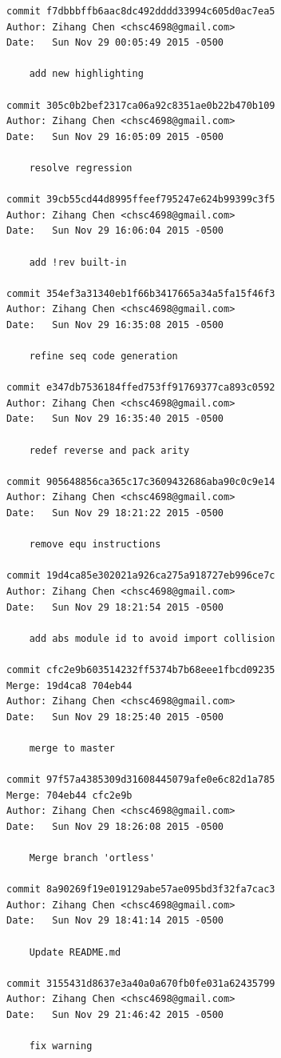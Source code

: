 \documentclass{report}
\begin{document}
\begin{appendices}
\begin{verbatim}
commit f7dbbbffb6aac8dc492dddd33994c605d0ac7ea5
Author: Zihang Chen <chsc4698@gmail.com>
Date:   Sun Nov 29 00:05:49 2015 -0500

    add new highlighting

commit 305c0b2bef2317ca06a92c8351ae0b22b470b109
Author: Zihang Chen <chsc4698@gmail.com>
Date:   Sun Nov 29 16:05:09 2015 -0500

    resolve regression

commit 39cb55cd44d8995ffeef795247e624b99399c3f5
Author: Zihang Chen <chsc4698@gmail.com>
Date:   Sun Nov 29 16:06:04 2015 -0500

    add !rev built-in

commit 354ef3a31340eb1f66b3417665a34a5fa15f46f3
Author: Zihang Chen <chsc4698@gmail.com>
Date:   Sun Nov 29 16:35:08 2015 -0500

    refine seq code generation

commit e347db7536184ffed753ff91769377ca893c0592
Author: Zihang Chen <chsc4698@gmail.com>
Date:   Sun Nov 29 16:35:40 2015 -0500

    redef reverse and pack arity

commit 905648856ca365c17c3609432686aba90c0c9e14
Author: Zihang Chen <chsc4698@gmail.com>
Date:   Sun Nov 29 18:21:22 2015 -0500

    remove equ instructions

commit 19d4ca85e302021a926ca275a918727eb996ce7c
Author: Zihang Chen <chsc4698@gmail.com>
Date:   Sun Nov 29 18:21:54 2015 -0500

    add abs module id to avoid import collision

commit cfc2e9b603514232ff5374b7b68eee1fbcd09235
Merge: 19d4ca8 704eb44
Author: Zihang Chen <chsc4698@gmail.com>
Date:   Sun Nov 29 18:25:40 2015 -0500

    merge to master

commit 97f57a4385309d31608445079afe0e6c82d1a785
Merge: 704eb44 cfc2e9b
Author: Zihang Chen <chsc4698@gmail.com>
Date:   Sun Nov 29 18:26:08 2015 -0500

    Merge branch 'ortless'

commit 8a90269f19e019129abe57ae095bd3f32fa7cac3
Author: Zihang Chen <chsc4698@gmail.com>
Date:   Sun Nov 29 18:41:14 2015 -0500

    Update README.md

commit 3155431d8637e3a40a0a670fb0fe031a62435799
Author: Zihang Chen <chsc4698@gmail.com>
Date:   Sun Nov 29 21:46:42 2015 -0500

    fix warning


\end{verbatim}
\end{appendices}
\end{document}
